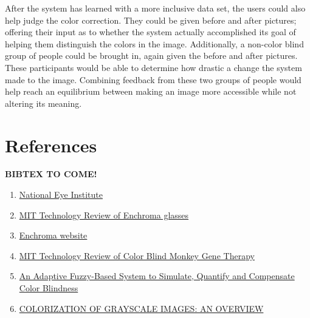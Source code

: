 \documentclass[12pt]{article}
\begin{document}
After the system has learned with a more inclusive data set, the users could also help judge the color correction. They could be given before and after pictures; offering their input as to whether the system actually accomplished its goal of helping them distinguish the colors in the image. Additionally, a non-color blind group of people could be brought in, again given the before and after pictures. These participants would be able to determine how drastic a change the system made to the image. Combining feedback from these two groups of people would help reach an equilibrium between making an image more accessible while not altering its meaning.


\section{References}
\singlespacing
\textbf{BIBTEX TO COME!}
\begin{enumerate}
	\item 
		\href{https://nei.nih.gov/health/color_blindness/facts_about}{National Eye Institute}

	\item
		\href{https://www.technologyreview.com/s/601782/how-enchromas-glasses-correct-color-blindness/}{MIT Technology Review of Enchroma glasses}
	
	\item
		\href{http://enchroma.com/contact-us/}{Enchroma website}
		
	\item
		\href{https://www.technologyreview.com/s/415339/color-blind-monkeys-get-full-color-vision/}{MIT Technology Review of Color Blind Monkey Gene Therapy}
		
	\item
		\href{https://arxiv.org/abs/1711.10662}{An Adaptive Fuzzy-Based System to Simulate, Quantify and Compensate Color Blindness}
		
	\item
		\href{https://pdfs.semanticscholar.org/e9e7/d61430c6438fc52031111e48f1224e14fa5a.pdf}{COLORIZATION OF GRAYSCALE IMAGES: AN OVERVIEW}

\end{enumerate}
\end{document}
